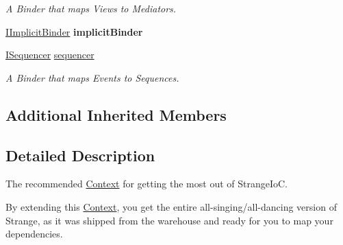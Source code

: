\begin{DoxyCompactItemize}
\begin{DoxyCompactList}\small\item\em A Binder that maps Views to Mediators. \end{DoxyCompactList}\item 
\hypertarget{classstrange_1_1extensions_1_1context_1_1impl_1_1_m_v_c_s_context_a033e3dc0771282fb405b3e070741fe6a}{\hyperlink{interfacestrange_1_1extensions_1_1implicit_bind_1_1api_1_1_i_implicit_binder}{I\-Implicit\-Binder} {\bfseries implicit\-Binder}}\label{classstrange_1_1extensions_1_1context_1_1impl_1_1_m_v_c_s_context_a033e3dc0771282fb405b3e070741fe6a}

\item 
\hypertarget{classstrange_1_1extensions_1_1context_1_1impl_1_1_m_v_c_s_context_af18bbe60ff223bebf24d0643c07c1c6f}{\hyperlink{interfacestrange_1_1extensions_1_1sequencer_1_1api_1_1_i_sequencer}{I\-Sequencer} \hyperlink{classstrange_1_1extensions_1_1context_1_1impl_1_1_m_v_c_s_context_af18bbe60ff223bebf24d0643c07c1c6f}{sequencer}}\label{classstrange_1_1extensions_1_1context_1_1impl_1_1_m_v_c_s_context_af18bbe60ff223bebf24d0643c07c1c6f}

\begin{DoxyCompactList}\small\item\em A Binder that maps Events to Sequences. \end{DoxyCompactList}\end{DoxyCompactItemize}
\subsection*{Additional Inherited Members}


\subsection{Detailed Description}
The recommended \hyperlink{classstrange_1_1extensions_1_1context_1_1impl_1_1_context}{Context} for getting the most out of Strange\-Io\-C. 

By extending this \hyperlink{classstrange_1_1extensions_1_1context_1_1impl_1_1_context}{Context}, you get the entire all-\/singing/all-\/dancing version of Strange, as it was shipped from the warehouse and ready for you to map your dependencies.

